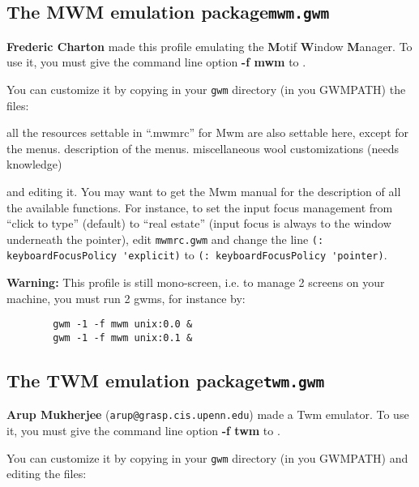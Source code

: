 \subsection{The MWM emulation package\hfill{\tt mwm.gwm}}

\centerline{}

{\bf Frederic Charton} made this profile emulating the {\bf M}otif
{\bf W}indow {\bf M}anager. To use it, you must give the command line 
option {\bf -f mwm} to {\GWM}.

You can customize it by copying in your
\verb"gwm" directory (in you GWMPATH) the files:

\begin{description}
 all the resources settable in ``.mwmrc'' for {\sc Mwm}
are also settable here, except for the menus.
 description of the menus.
 miscellaneous wool customizations (needs {\WOOL}
knowledge)
\end{description}

and editing it. You may want to get the {\sc Mwm} manual for the description
of all the available functions. For instance, to set the input focus management
from ``click to type'' (default) to ``real estate'' (input focus is always
to the window underneath the pointer), edit \verb"mwmrc.gwm" and change
the line \verb"(: keyboardFocusPolicy 'explicit)" to 
\verb"(: keyboardFocusPolicy 'pointer)".

{\bf Warning:} This profile is still mono-screen, i.e. to manage 2 screens
on your machine, you must run 2 gwms, for instance by:
{\exemplefont\begin{verbatim}
        gwm -1 -f mwm unix:0.0 &
        gwm -1 -f mwm unix:0.1 &
\end{verbatim}}

\subsection{The TWM emulation package\hfill{\tt twm.gwm}}

\centerline{}

{\bf Arup Mukherjee} (\verb"arup@grasp.cis.upenn.edu") made a {\sc
Twm} emulator. To use it, you must give the command line 
option {\bf -f twm} to {\GWM}.

You can customize it by copying in your \verb"gwm"
directory (in you GWMPATH) and editing the files:

